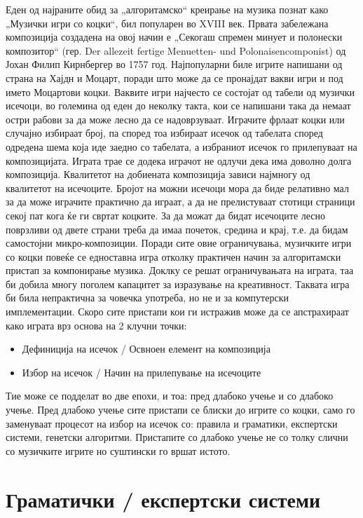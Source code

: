 Еден од најраните обид за „алгоритамско“ креирање на музика познат како „Музички игри со коцки“, бил популарен во XVIII век. Првата забележана композиција создадена на овој начин е „Секогаш спремен минует и полонески композитор“ (гер. Der allezeit fertige Menuetten- und Polonaisencomponist) од Јохан Филип Кирнбергер во 1757 год. Најпопуларни биле игрите напишани од страна на Хајдн и Моцарт, поради што може да се пронајдат вакви игри и под името Моцартови коцки. Ваквите игри најчесто се состојат од табели од музички исечоци, во големина од еден до неколку такта, кои се напишани така да немаат остри рабови за да може лесно да се надоврзуваат. Играчите фрлаат коцки или случајно избираат број, па според тоа избираат исечок од табелата според одредена шема која иде заедно со табелата, а избраниот исечок го прилепуваат на композицијата. Играта трае се додека играчот не одлучи дека има доволно долга композиција. Квалитетот на добиената композиција зависи најмногу од квалитетот на исечоците. Бројот на можни исечоци мора да биде релативно мал за да може играчите практично да играат, а да не прелистуваат стотици страници секој пат кога ќе ги свртат коцките. За да можат да бидат исечоците лесно поврзливи од двете страни треба да имаа почеток, средина и крај, т.е. да бидам самостојни микро-композиции. Поради сите овие ограничувања, музичките игри со коцки повеќе се едноставна игра отколку практичен начин за алгоритамски пристап за компонирање музика. Доклку се решат ограничувањата на играта, таа би добила многу поголем капацитет за изразување на креативност. Таквата игра би била непрактична за човечка употреба, но не и за компутерски имплементации. Скоро сите пристапи кои ги истражив може да се апстрахираат како играта врз основа на 2 клучни точки:
\begin{itemize}
    \item Дефиниција на исечок / Освноен елемент на композиција 
    \item Избор на исечок / Начин на прилепување на исечоците
\end{itemize}
Тие може се подделат во две епохи, и тоа: пред длабоко учење и со длабоко учење. Пред длабоко учење сите пристапи се блиски до игрите со коцки, само го заменуваат процесот на избор на исечок со: правила и граматики, експертски системи, генетски алгоритми. Пристапите со длабоко учење не со толку слични со музичките игрите но суштински го вршат истото. 

\section{Граматички / експертски системи} 

